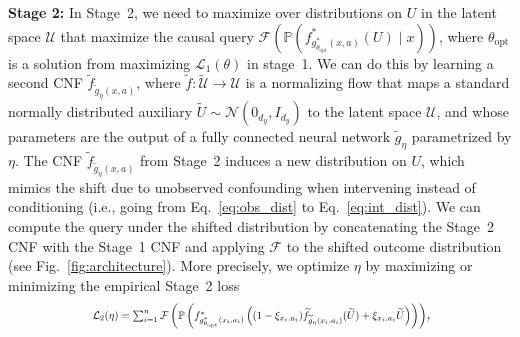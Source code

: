\documentclass{article} %
\theoremstyle{definition}
\theoremstyle{plain}
\begin{document}
\textbf{Stage 2:} In Stage~2, we need to maximize over distributions on $U$ in the latent space $\mathcal{U}$ that maximize the causal query $\mathcal{F}(\mathbb{P}(f^\ast_{g^\ast_{\theta_\mathrm{opt}}(x, a)}(U) \mid x))$, where $\theta_\mathrm{opt}$ is a solution from maximizing $\mathcal{L}_1(\theta)$ in stage~1. We can do this by learning a {second CNF} $\widetilde{f}_{\widetilde{g}_\eta(x, a)}$, where $\widetilde{f} \colon \widetilde{\mathcal{U}} \to \mathcal{U}$ is a normalizing flow that maps a standard normally distributed auxiliary $\widetilde{U} \sim \mathcal{N}(0_{d_y}, I_{d_y})$ to the latent space $\mathcal{U}$, and whose parameters are the output of a fully connected neural network $\widetilde{g}_\eta$ parametrized by $\eta$. The CNF $\widetilde{f}_{\widetilde{g}_\eta(x, a)}$ from Stage~2 induces a new distribution on $U$, which mimics the shift due to unobserved confounding when intervening instead of conditioning (i.e., going from Eq.~\eqref{eq:obs_dist} to Eq.~\eqref{eq:int_dist}). We can compute the query under the shifted distribution by concatenating the Stage~2 CNF with the Stage~1 CNF and applying $\mathcal{F}$ to the shifted outcome distribution (see Fig.~\ref{fig:architecture}). More precisely, we optimize $\eta$ by maximizing or minimizing the empirical Stage~2 loss 
\vspace{-0.1cm}
\begin{equation}\label{eq:loss_stage2}
\resizebox{.7\hsize}{!}{
    $\mathcal{L}_2(\eta) =  \sum_{i=1}^n \mathcal{F} \left( \mathbb{P} \left({f^\ast_{g^\ast_{\theta_\mathrm{opt}}(x_i, a_i)}}\left( (1 - \xi_{x_i, a_i}) \widetilde{f}_{\widetilde{g}_\eta(x_i, a_i)}(\widetilde{U}) +  \xi_{x_i, a_i} \widetilde{U}\right) \right) \right)$}, 
\end{equation}
\vspace{-0.1cm}
\end{document}
